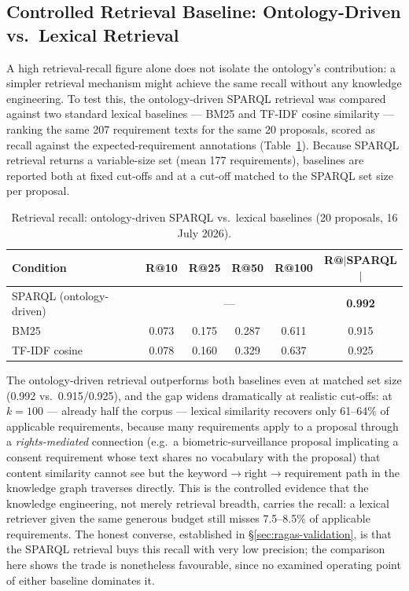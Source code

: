 \subsection{Controlled Retrieval Baseline: Ontology-Driven vs.\ Lexical Retrieval}
\label{sec:retrieval-baselines}

A high retrieval-recall figure alone does not isolate the ontology's contribution: a simpler retrieval mechanism might achieve the same recall without any knowledge engineering. To test this, the ontology-driven SPARQL retrieval was compared against two standard lexical baselines --- BM25 and TF-IDF cosine similarity --- ranking the same 207 requirement texts for the same 20 proposals, scored as recall against the expected-requirement annotations (Table~\ref{tab:retrieval-baselines}). Because SPARQL retrieval returns a variable-size set (mean 177 requirements), baselines are reported both at fixed cut-offs and at a cut-off matched to the SPARQL set size per proposal.

\begin{table}[htbp]
\centering
\caption{Retrieval recall: ontology-driven SPARQL vs.\ lexical baselines (20 proposals, 16 July 2026).}
\label{tab:retrieval-baselines}
\begin{tabular}{lccccc}
\toprule
\textbf{Condition} & \textbf{R@10} & \textbf{R@25} & \textbf{R@50} & \textbf{R@100} & \textbf{R@$|$SPARQL$|$} \\
\midrule
SPARQL (ontology-driven) & \multicolumn{4}{c}{---} & \textbf{0.992} \\
BM25 & 0.073 & 0.175 & 0.287 & 0.611 & 0.915 \\
TF-IDF cosine & 0.078 & 0.160 & 0.329 & 0.637 & 0.925 \\
\bottomrule
\end{tabular}
\end{table}

The ontology-driven retrieval outperforms both baselines even at matched set size (0.992 vs.\ 0.915/0.925), and the gap widens dramatically at realistic cut-offs: at $k=100$ --- already half the corpus --- lexical similarity recovers only 61--64\% of applicable requirements, because many requirements apply to a proposal through a \emph{rights-mediated} connection (e.g.\ a biometric-surveillance proposal implicating a consent requirement whose text shares no vocabulary with the proposal) that content similarity cannot see but the keyword$\to$right$\to$requirement path in the knowledge graph traverses directly. This is the controlled evidence that the knowledge engineering, not merely retrieval breadth, carries the recall: a lexical retriever given the same generous budget still misses 7.5--8.5\% of applicable requirements. The honest converse, established in \S\ref{sec:ragas-validation}, is that the SPARQL retrieval buys this recall with very low precision; the comparison here shows the trade is nonetheless favourable, since no examined operating point of either baseline dominates it.

